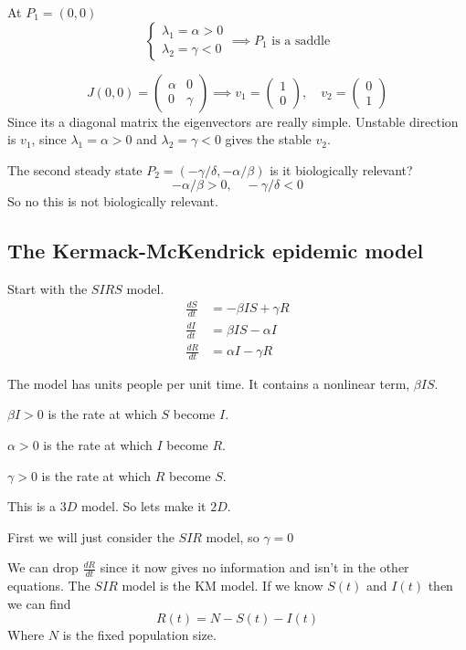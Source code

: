 \documentclass{X:/Documents/Coding/Latex/myassignment}
\begin{document}
At $P_1=(0,0)$
\[\begin{cases}
    \lambda_1 = \alpha > 0\\
    \lambda_2 = \gamma <0 
\end{cases}\implies P_1 \text{ is a saddle}\]

\[J(0,0) = \begin{pmatrix}
    \alpha&0\\0&\gamma
\end{pmatrix} \implies v_1 = \begin{pmatrix}
    1\\0
\end{pmatrix}, \quad v_2 =\begin{pmatrix}
    0\\1
\end{pmatrix}\]
Since its a diagonal matrix the eigenvectors are really simple.
Unstable direction is $v_1$, since $\lambda_1 = \alpha > 0$ and $\lambda_2 = \gamma < 0$ gives the stable $v_2$.

The second steady state $P_2 = (-\gamma/\delta, -\alpha/\beta)$ is it biologically relevant? 
\[-\alpha/\beta >0 ,\quad -\gamma/\delta < 0\]
So no this is not biologically relevant.





\subsection{The Kermack-McKendrick epidemic model}
Start with the $SIRS$ model. 
\begin{align*}
    \frac{dS}{dt} &=-\beta IS + \gamma R \\
    \frac{dI}{dt} &=\beta IS - \alpha I \\
    \frac{dR}{dt} &= \alpha I - \gamma R
\end{align*}

The model has units people per unit time. It contains a nonlinear term, $\beta IS$.

$\beta I > 0$ is the rate at which $S$ become $I$.

$\alpha > 0$ is the rate at which $I$ become $R$.

$\gamma > 0$ is the rate at which $R$ become $S$.

This is a $3D$ model. So lets make it $2D$.

First we will just consider the $SIR$ model, so $\gamma = 0$

We can drop $\frac{dR}{dt}$ since it now gives no information and isn't in the other equations. The $SIR$ model is the KM model. If we know $S(t)$ and $I(t)$ then we can find 
\[R(t) = N - S(t) - I(t)\]
Where $N$ is the fixed population size.
\end{document}
